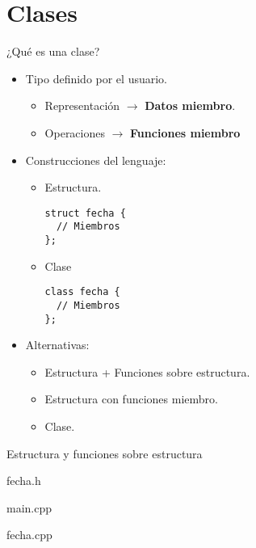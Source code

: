 \section{Clases}

\begin{frame}[fragile]{¿Qué es una clase?}
\begin{itemize}
  \item Tipo definido por el usuario.
    \begin{itemize}
      \item \alert{Representación} $\rightarrow$ \textbf{Datos miembro}.
      \item \alert{Operaciones} $\rightarrow$ \textbf{Funciones miembro}
    \end{itemize}
  \item Construcciones del lenguaje:
    \begin{itemize}
      \item Estructura.
\begin{lstlisting}
struct fecha {
  // Miembros
};
\end{lstlisting}
      \item Clase
\begin{lstlisting}
class fecha {
  // Miembros
};
\end{lstlisting}
    \end{itemize}
  \item Alternativas:
    \begin{itemize}
      \item Estructura + Funciones sobre estructura.
      \item Estructura con funciones miembro.
      \item Clase.    
    \end{itemize}
\end{itemize}
\end{frame}

\begin{frame}{Estructura y funciones sobre estructura}
\vspace{-.8em}
\begin{block}{fecha.h}

\end{block}
\begin{block}{main.cpp}

\end{block}
\end{frame}

\vspace{-.25em}
\begin{frame}
\begin{block}{fecha.cpp}
\mode<presentation>{

}
\end{block}
\end{frame}

